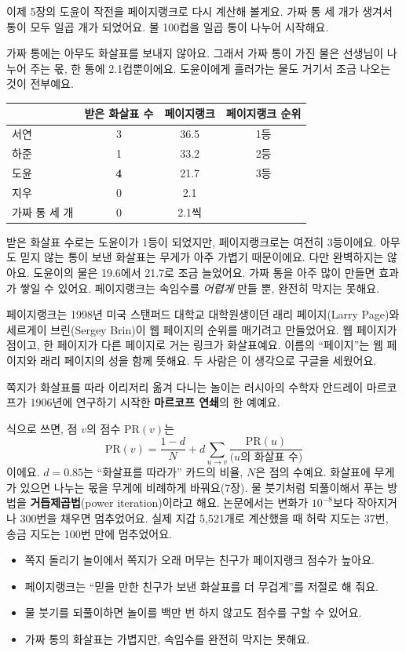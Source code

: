 이제 5장의 도윤이 작전을 페이지랭크로 다시 계산해 볼게요.
가짜 통 세 개가 생겨서 통이 모두 일곱 개가 되었어요.
물 100컵을 일곱 통이 나누어 시작해요.

가짜 통에는 아무도 화살표를 보내지 않아요.
그래서 가짜 통이 가진 물은 선생님이 나누어 주는 몫, 한 통에 2.1컵뿐이에요.
도윤이에게 흘러가는 물도 거기서 조금 나오는 것이 전부예요.

\begin{center}
\small
\begin{tabular}{@{}lccc@{}}
\toprule
& 받은 화살표 수 & 페이지랭크 & 페이지랭크 순위 \\
\midrule
서연 & 3 & 36.5 & 1등 \\
하준 & 1 & 33.2 & 2등 \\
도윤 & \textbf{4} & 21.7 & 3등 \\
지우 & 0 & 2.1 & \\
가짜 통 세 개 & 0 & 2.1씩 & \\
\bottomrule
\end{tabular}
\end{center}

받은 화살표 수로는 도윤이가 1등이 되었지만, 페이지랭크로는 여전히 3등이에요.
아무도 믿지 않는 통이 보낸 화살표는 무게가 아주 가볍기 때문이에요.
다만 완벽하지는 않아요.
도윤이의 물은 19.6에서 21.7로 조금 늘었어요.
가짜 통을 아주 많이 만들면 효과가 쌓일 수 있어요.
페이지랭크는 속임수를 \emph{어렵게} 만들 뿐, 완전히 막지는 못해요.

\begin{deeper}
페이지랭크는 1998년 미국 스탠퍼드 대학교 대학원생이던 래리 페이지(Larry Page)와 세르게이 브린(Sergey Brin)이 웹 페이지의 순위를 매기려고 만들었어요.
웹 페이지가 점이고, 한 페이지가 다른 페이지로 거는 링크가 화살표예요.
이름의 “페이지”는 웹 페이지와 래리 페이지의 성을 함께 뜻해요.
두 사람은 이 생각으로 구글을 세웠어요.

쪽지가 화살표를 따라 이리저리 옮겨 다니는 놀이는 러시아의 수학자 안드레이 마르코프가 1906년에 연구하기 시작한 \textbf{마르코프 연쇄}의 한 예예요.

식으로 쓰면, 점 $v$의 점수 $\mathrm{PR}(v)$는
\[
\mathrm{PR}(v) = \frac{1-d}{N} + d \sum_{u \to v} \frac{\mathrm{PR}(u)}{\text{($u$의 화살표 수)}}
\]
이에요. $d=0.85$는 “화살표를 따라가” 카드의 비율, $N$은 점의 수예요.
화살표에 무게가 있으면 나누는 몫을 무게에 비례하게 바꿔요(7장).
물 붓기처럼 되풀이해서 푸는 방법을 \textbf{거듭제곱법}(power iteration)이라고 해요.
논문에서는 변화가 $10^{-8}$보다 작아지거나 300번을 채우면 멈추었어요.
실제 지갑 5,521개로 계산했을 때 허락 지도는 37번, 송금 지도는 100번 만에 멈추었어요.
\end{deeper}

\begin{learned}
\begin{itemize}
\item 쪽지 돌리기 놀이에서 쪽지가 오래 머무는 친구가 페이지랭크 점수가 높아요.
\item 페이지랭크는 “믿을 만한 친구가 보낸 화살표를 더 무겁게”를 저절로 해 줘요.
\item 물 붓기를 되풀이하면 놀이를 백만 번 하지 않고도 점수를 구할 수 있어요.
\item 가짜 통의 화살표는 가볍지만, 속임수를 완전히 막지는 못해요.
\end{itemize}
\end{learned}
